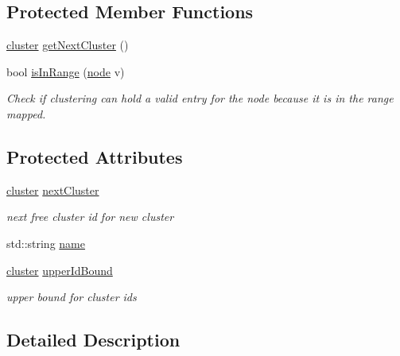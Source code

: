 \subsection*{Protected Member Functions}
\begin{DoxyCompactItemize}
\item 
\hyperlink{namespace_ensemble_clustering_a5ae38234e207add524443be6e597b970}{cluster} \hyperlink{class_ensemble_clustering_1_1_clustering_a7ab76ffd8b0068e049f854e07e8902eb}{get\-Next\-Cluster} ()
\item 
bool \hyperlink{class_ensemble_clustering_1_1_clustering_a7d8cd0be7f1bde9e7cdf2cf10c54c121}{is\-In\-Range} (\hyperlink{namespace_ensemble_clustering_ae829290aeccd1a420b17a37fd901f114}{node} v)
\begin{DoxyCompactList}\small\item\em Check if clustering can hold a valid entry for the node because it is in the range mapped. \end{DoxyCompactList}\end{DoxyCompactItemize}
\subsection*{Protected Attributes}
\begin{DoxyCompactItemize}
\item 
\hyperlink{namespace_ensemble_clustering_a5ae38234e207add524443be6e597b970}{cluster} \hyperlink{class_ensemble_clustering_1_1_clustering_a47de59cf22e93a801cac55eb001b6d3d}{next\-Cluster}
\begin{DoxyCompactList}\small\item\em next free cluster id for new cluster \end{DoxyCompactList}\item 
std\-::string \hyperlink{class_ensemble_clustering_1_1_clustering_affe0177a3d80ddd03d475307a74b3a1c}{name}
\item 
\hyperlink{namespace_ensemble_clustering_a5ae38234e207add524443be6e597b970}{cluster} \hyperlink{class_ensemble_clustering_1_1_clustering_a59e76a2bdf80c98186938c46814b9e36}{upper\-Id\-Bound}
\begin{DoxyCompactList}\small\item\em upper bound for cluster ids \end{DoxyCompactList}\end{DoxyCompactItemize}


\subsection{Detailed Description}


